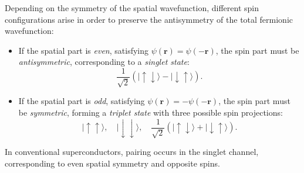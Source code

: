 Depending on the symmetry of the spatial wavefunction, different spin configurations arise in order to preserve the antisymmetry of the total fermionic wavefunction:
\begin{itemize}
    \item If the spatial part is \textit{even}, satisfying $\psi(\mathbf{r}) = \psi(-\mathbf{r})$,  
    the spin part must be \textit{antisymmetric}, corresponding to a \emph{singlet state}:
    \[
    \frac{1}{\sqrt{2}}\left(|\uparrow\downarrow\rangle - |\downarrow\uparrow\rangle\right).
    \]

    \item If the spatial part is \textit{odd}, satisfying $\psi(\mathbf{r}) = -\psi(-\mathbf{r})$,  
    the spin part must be \textit{symmetric}, forming a \emph{triplet state} with three possible spin projections:
    \[
    |\uparrow\uparrow\rangle, \quad
    |\downarrow\downarrow\rangle, \quad
    \frac{1}{\sqrt{2}}\left(|\uparrow\downarrow\rangle + |\downarrow\uparrow\rangle\right).
    \]
\end{itemize}
In conventional superconductors, pairing occurs in the singlet channel, corresponding to even spatial symmetry and opposite spins.

